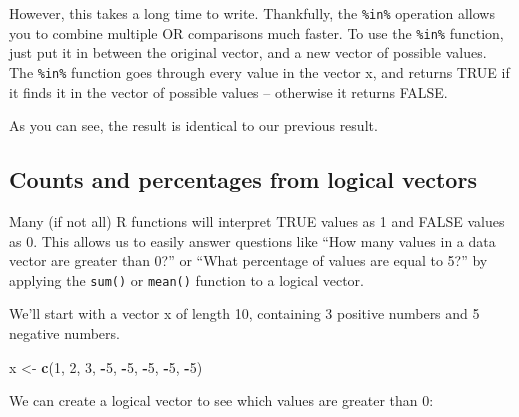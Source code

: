 \documentclass[]{book}
\newenvironment{Shaded}{\begin{snugshade}}{\end{snugshade}}
\newcommand{\KeywordTok}[1]{\textcolor[rgb]{0.13,0.29,0.53}{\textbf{#1}}}
\newcommand{\DecValTok}[1]{\textcolor[rgb]{0.00,0.00,0.81}{#1}}
\newcommand{\StringTok}[1]{\textcolor[rgb]{0.31,0.60,0.02}{#1}}
\newcommand{\OperatorTok}[1]{\textcolor[rgb]{0.81,0.36,0.00}{\textbf{#1}}}
\newcommand{\NormalTok}[1]{#1}
\theoremstyle{definition}
\theoremstyle{definition}
\theoremstyle{remark}
\begin{document}
However, this takes a long time to write. Thankfully, the
\texttt{\%in\%} operation allows you to combine multiple OR comparisons
much faster. To use the \texttt{\%in\%} function, just put it in between
the original vector, and a new vector of possible values. The
\texttt{\%in\%} function goes through every value in the vector x, and
returns TRUE if it finds it in the vector of possible values --
otherwise it returns FALSE.

\begin{Shaded}
\end{Shaded}

As you can see, the result is identical to our previous result.

\subsection{Counts and percentages from logical
vectors}\label{counts-and-percentages-from-logical-vectors}

Many (if not all) R functions will interpret TRUE values as 1 and FALSE
values as 0. This allows us to easily answer questions like ``How many
values in a data vector are greater than 0?'' or ``What percentage of
values are equal to 5?'' by applying the \texttt{sum()} or
\texttt{mean()} function to a logical vector.

We'll start with a vector x of length 10, containing 3 positive numbers
and 5 negative numbers.

\begin{Shaded}
\begin{Highlighting}[]
\NormalTok{x <-}\StringTok{ }\KeywordTok{c}\NormalTok{(}\DecValTok{1}\NormalTok{, }\DecValTok{2}\NormalTok{, }\DecValTok{3}\NormalTok{, }\OperatorTok{-}\DecValTok{5}\NormalTok{, }\OperatorTok{-}\DecValTok{5}\NormalTok{, }\OperatorTok{-}\DecValTok{5}\NormalTok{, }\OperatorTok{-}\DecValTok{5}\NormalTok{, }\OperatorTok{-}\DecValTok{5}\NormalTok{)}
\end{Highlighting}
\end{Shaded}

We can create a logical vector to see which values are greater than 0:
\end{document}
